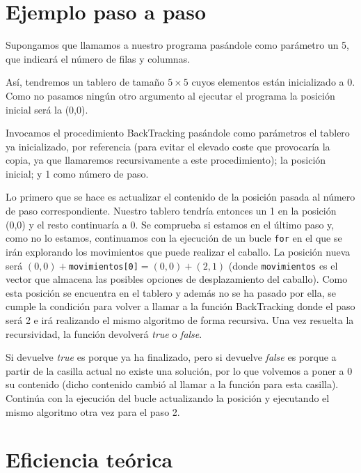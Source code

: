 \documentclass[11pt]{article}
\begin{document}
\section*{Ejemplo paso a paso}


Supongamos que llamamos a nuestro  programa pasándole como parámetro un 5, que indicará el número de filas y columnas.

Así, tendremos un tablero de tamaño $5\times5$ cuyos elementos están inicializado a 0. Como no pasamos ningún otro argumento al ejecutar el programa la posición inicial será la (0,0).

Invocamos el procedimiento BackTracking pasándole como parámetros el tablero ya inicializado, por referencia (para evitar el elevado coste que provocaría la copia, ya que llamaremos recursivamente a este procedimiento); la posición inicial; y 1 como número de paso.

Lo primero que se hace es actualizar el contenido de la posición pasada al número de paso correspondiente. Nuestro tablero tendría entonces un 1 en la posición (0,0) y el resto continuaría a 0.
Se comprueba si estamos en el último paso y, como no lo estamos, continuamos con la ejecución de un bucle \verb|for| en el que se irán explorando los movimientos que puede realizar el caballo. La posición nueva será $(0,0)+$\verb|movimientos[0]|$=(0,0)+(2,1)$ (donde \verb|movimientos| es el vector que almacena las posibles opciones de desplazamiento del caballo). Como esta posición se encuentra en el tablero y además no se ha pasado por ella, se cumple la condición para volver a llamar a la función BackTracking donde el paso será 2 e irá realizando el mismo algoritmo de forma recursiva. Una vez resuelta la recursividad, la función devolverá \textit{true} o \textit{false}.

Si devuelve \textit{true} es porque ya ha finalizado, pero si devuelve \textit{false} es porque a partir de la casilla actual no existe una solución, por lo que volvemos a poner a 0 su contenido (dicho contenido cambió al llamar a la función para esta casilla). Continúa con la ejecución del bucle actualizando la posición y ejecutando el mismo algoritmo otra vez para el paso 2.


\section*{Eficiencia teórica}
\end{document}
